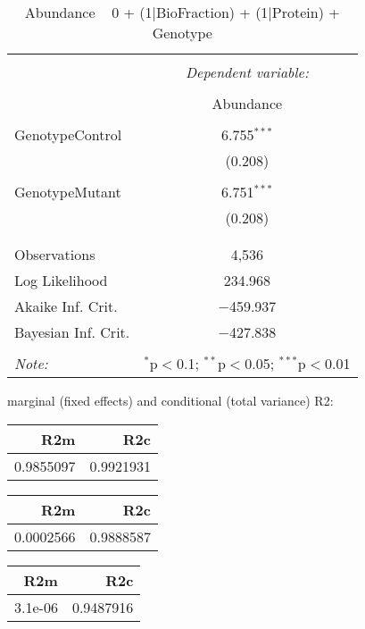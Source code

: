 \documentclass[11pt]{report}
\begin{document}
\begin{table}[!htbp] \centering 
  \caption{Abundance ~ 0 + (1|BioFraction) + (1|Protein) + Genotype} 
  \label{} 
\begin{tabular}{@{\extracolsep{5pt}}lc} 
\\[-1.8ex]\hline 
\hline \\[-1.8ex] 
 & \multicolumn{1}{c}{\textit{Dependent variable:}} \\ 
\cline{2-2} 
\\[-1.8ex] & Abundance \\ 
\hline \\[-1.8ex] 
 GenotypeControl & 6.755$^{***}$ \\ 
  & (0.208) \\ 
  & \\ 
 GenotypeMutant & 6.751$^{***}$ \\ 
  & (0.208) \\ 
  & \\ 
\hline \\[-1.8ex] 
Observations & 4,536 \\ 
Log Likelihood & 234.968 \\ 
Akaike Inf. Crit. & $-$459.937 \\ 
Bayesian Inf. Crit. & $-$427.838 \\ 
\hline 
\hline \\[-1.8ex] 
\textit{Note:}  & \multicolumn{1}{r}{$^{*}$p$<$0.1; $^{**}$p$<$0.05; $^{***}$p$<$0.01} \\ 
\end{tabular} 
\end{table} 
marginal (fixed effects) and conditional (total variance) R2:

\begin{tabular}{r|r}
\hline
R2m & R2c\\
\hline
0.9855097 & 0.9921931\\
\hline
\end{tabular}

\begin{tabular}{r|r}
\hline
R2m & R2c\\
\hline
0.0002566 & 0.9888587\\
\hline
\end{tabular}

\begin{tabular}{r|r}
\hline
R2m & R2c\\
\hline
3.1e-06 & 0.9487916\\
\hline
\end{tabular}
\end{document}
